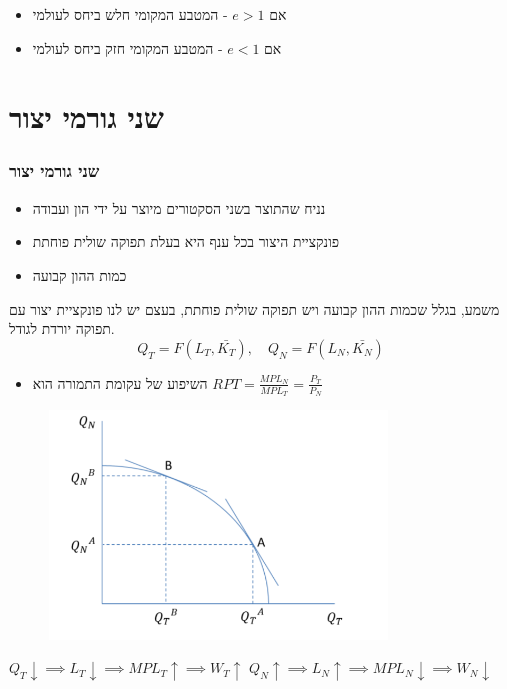 \documentclass[usenames,dvipsnames]{beamer}
\begin{document}
\begin{RTL}
\begin{frame}
    \begin{itemize}
        \item אם $e > 1$ - המטבע המקומי חלש ביחס לעולמי
        \item אם $e < 1$ - המטבע המקומי חזק ביחס לעולמי
    \end{itemize}

\end{frame}

\section{שני גורמי יצור}
\begin{frame}[allowframebreaks]
    \frametitle{שני גורמי יצור}
    \begin{itemize}
        \item נניח שהתוצר בשני הסקטורים מיוצר על ידי הון ועבודה
        \item פונקציית היצור בכל ענף היא בעלת תפוקה שולית פוחתת
        \item כמות ההון קבועה
    \end{itemize}
    משמע, בגלל שכמות ההון קבועה ויש תפוקה שולית פוחתת, בעצם יש לנו פונקציית יצור עם תפוקה יורדת לגודל.
    $$
    Q_T = F(L_T, \bar{K_T}), \quad Q_N = F(L_N, \bar{K_N})
    $$
    \begin{itemize}
    \item השיפוע של עקומת התמורה הוא $RPT = \frac{MPL_N}{MPL_T} = \frac{P_T}{P_N}$
    \end{itemize}

    \framebreak
    \begin{figure}[ht]
        \centering
        \includegraphics[width=0.8\textwidth]{TNT.png}
    \end{figure}
        \begin{center}
 $Q_T \downarrow \implies L_T \downarrow \implies MPL_T \uparrow \implies W_T \uparrow$
 $Q_N \uparrow \implies L_N \uparrow \implies MPL_N \downarrow \implies W_N \downarrow$
    \end{center}





\end{frame}
\end{RTL}
\end{document}
